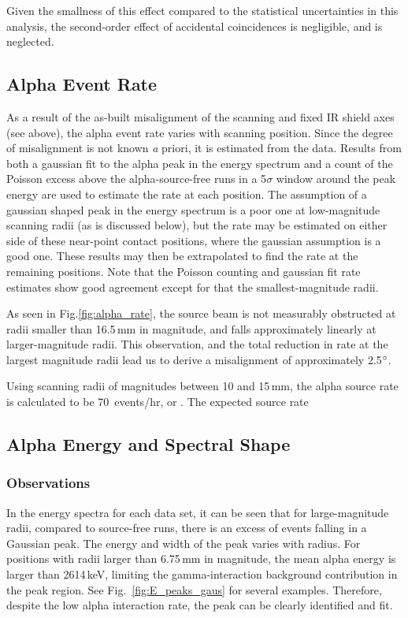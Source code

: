 \documentclass[groupedaddress,rmp,amsmath,amssymb,bibnotes,altaffilletter,twocolumn]{revtex4-1}
\begin{document}
Given the smallness of this effect compared to the statistical uncertainties in this analysis, the second-order effect of accidental coincidences is negligible, and is neglected.  

\subsection{Alpha Event Rate}
As a result of the as-built misalignment of the scanning and fixed IR shield axes (see above), the alpha event rate varies with scanning position. Since the degree of misalignment is not known {\textit a priori}, it is estimated from the data. Results from both a gaussian fit to the alpha peak in the energy spectrum and a count of the Poisson excess above the alpha-source-free runs in a 5$\sigma$ window around the peak energy are used to estimate the rate at each position. The assumption of a gaussian shaped peak in the energy spectrum is a poor one at low-magnitude scanning radii (as is discussed below), but the rate may be estimated on either side of these near-point contact positions, where the gaussian assumption is a good one. These results may then be extrapolated to find the rate at the remaining positions. Note that the Poisson counting and gaussian fit rate estimates show good agreement except for that the smallest-magnitude radii. 

As seen in Fig.\ref{fig:alpha_rate}, the source beam is not measurably obstructed at radii smaller than 16.5\,mm in magnitude, and falls approximately linearly at larger-magnitude radii. This observation, and the total reduction in rate at the largest magnitude radii lead us to derive a misalignment of approximately 2.5$\degree$. 

Using scanning radii of magnitudes between 10 and 15\,mm, the alpha source rate is calculated to be 70~events/hr, or . The expected source rate

\subsection{Alpha Energy and Spectral Shape}
\subsubsection{Observations}
In the energy spectra for each data set, it can be seen that for large-magnitude radii, compared to source-free runs, there is an excess of events falling in a Gaussian peak. The energy and width of the peak varies with radius. For positions with radii larger than 6.75\,mm in magnitude, the mean alpha energy is larger than 2614\,keV, limiting the gamma-interaction background contribution in the peak region. See Fig.~\ref{fig:E_peaks_gaus} for several examples. Therefore, despite the low alpha interaction rate, the peak can be clearly identified and fit.
\end{document}
